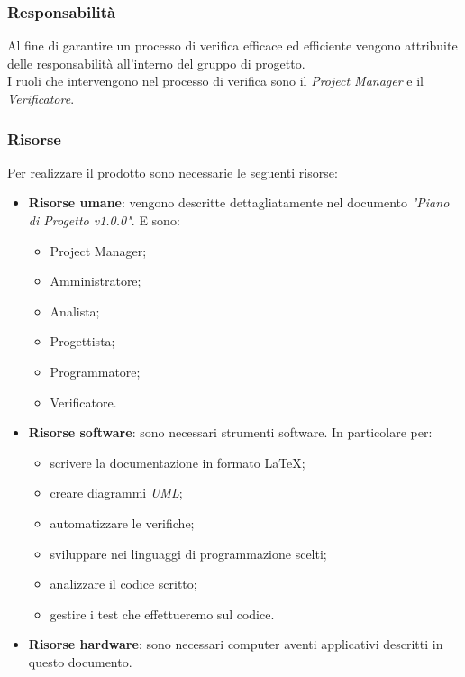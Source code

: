 \documentclass[12pt,a4paper,titlepage]{article}
\begin{document}
	\subsubsection{Responsabilità}
	Al fine di garantire un processo di verifica efficace ed efficiente vengono attribuite delle responsabilità all'interno del gruppo di progetto.\\
	I ruoli che intervengono nel processo di verifica sono il \textit{Project Manager} e il \textit{Verificatore}.
	
	\subsubsection{Risorse}
	Per realizzare il prodotto sono necessarie le seguenti risorse:
	\begin{itemize}
		\item \textbf{Risorse umane}: vengono descritte dettagliatamente nel documento \textit{"Piano di Progetto v1.0.0"}. E sono:
		\begin{itemize}
			\item Project Manager;
			\item Amministratore;
			\item Analista;
			\item Progettista;
			\item Programmatore;
			\item Verificatore.
		\end{itemize}
		\item \textbf{Risorse software}: sono necessari strumenti software. In particolare per:
		\begin{itemize}
			\item scrivere la documentazione in formato \LaTeX;
			\item creare diagrammi \textit{UML};
			\item automatizzare le verifiche;
			\item sviluppare nei linguaggi di programmazione scelti;
			\item analizzare il codice scritto;
			\item gestire i test che effettueremo sul codice.
		\end{itemize}
		\item \textbf{Risorse hardware}: sono necessari computer aventi applicativi descritti in questo documento. 
	\end{itemize}
\end{document}
